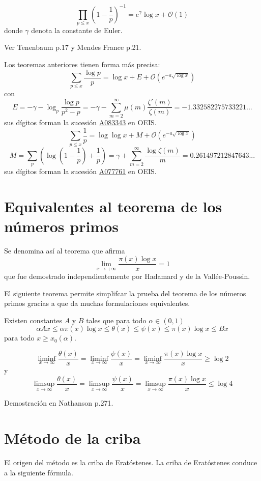 \documentclass[TAN.tex]{subfiles}
\begin{document}
\begin{teorema}
\[ \prod_{p≤x} \left(1-\frac{1}{p}\right)^{-1} = e^γ\log x + \mathcal{O}(1) \]
donde $γ$ denota la constante de Euler.
\end{teorema}
Ver Tenenbaum p.17 y Mendes France p.21.

Los teoremas anteriores tienen forma más precisa:
\[ \sum_{p≤x} \frac{\log p}{p} = \log x + E + \mathcal{O}(e^{-a\sqrt{\log x}}) \]
con
\[ E = -γ-\log_{p} \frac{\log p}{p^2-p} = -γ-\sum_{m=2}^{∞} μ(m) \frac{ζ'(m)}{ζ(m)} = -1.332582275733221... \]
sus dígitos forman la sucesión \href{https://oeis.org/A083343}{A083343} en OEIS.
\[ \sum_{p≤x} \frac{1}{p} = \log \log x + M + \mathcal{O}(e^{-a\sqrt{\log x}}) \]
\[ M = \sum_{p} \left(\log \left(1-\frac{1}{p}\right)+\frac{1}{p}\right) = γ + \sum_{m=2}^{∞} \frac{\log ζ(m)}{m} = 0.261497212847643... \]
sus dígitos forman la sucesión \href{https://oeis.org/A077761}{A077761} en OEIS. 

\section{Equivalentes al teorema de los números primos}
Se denomina así al teorema que afirma
\[ \lim_{x\to+∞} \frac{π(x)\log x}{x} = 1 \]
que fue demostrado independientemente por Hadamard y de la Vallée-Poussin.

El siguiente teorema permite simplifcar la prueba del teorema de los números primos gracias a que da muchas formulaciones equivalentes.

\begin{teorema}[Chebyshev]
Existen constantes $A$ y $B$ tales que para todo $α \in (0,1)$
\[ αAx ≤ απ(x)\log x ≤ θ(x) ≤ ψ(x) ≤ π(x)\log x ≤ Bx \]
para todo $x ≥ x_0(α)$.
\end{teorema}

\begin{teorema}[Chebyshev]
\[ \liminf_{x\to∞} \frac{θ(x)}{x} = \liminf_{x\to∞} \frac{ψ(x)}{x} = \liminf_{x\to∞} \frac{π(x)\log x}{x} ≥ \log 2 \]
y
\[ \limsup_{x\to∞} \frac{θ(x)}{x} = \limsup_{x\to∞} \frac{ψ(x)}{x} = \limsup_{x\to∞} \frac{π(x)\log x}{x} ≤ \log 4 \]
\end{teorema}
Demostración en Nathanson p.271.

\section{Método de la criba}
El origen del método es la criba de Eratóstenes. La criba de Eratóstenes conduce a la siguiente fórmula.
\end{document}
